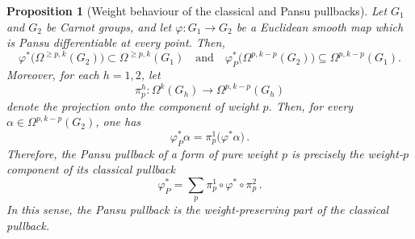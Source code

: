 \documentclass[dvipsnames]{amsart}
\newtheorem{proposition}[theorem]{Proposition}
\theoremstyle{definition}
\theoremstyle{definition}
\numberwithin{equation}{section}
\begin{document}
\begin{proposition}[Weight behaviour of the classical and Pansu pullbacks]
\label{prop:weight-behaviour-pullbacks}
Let \(G_1\) and \(G_2\) be Carnot groups, and let $\varphi:G_1\longrightarrow G_2$
be a Euclidean smooth map which is Pansu differentiable at
every point.
Then,
\begin{equation*}
    \varphi^* \big(\Omega^{\geq p, k}(G_2)\big) \subset \Omega^{\geq p, k} (G_1) \quad \text{and} \quad \varphi_P^*\bigl(\Omega^{p,k-p}(G_2)\bigr)
\subseteq
\Omega^{p,k-p}(G_1).
\end{equation*}
Moreover, for each $h=1,2$, let
\[
\pi_p^h:\Omega^k(G_h)\longrightarrow\Omega^{p,k-p}(G_h)
\]
denote the projection onto the component of weight \(p\). Then, for every
\(\alpha\in\Omega^{p,k-p}(G_2)\), one has $$\varphi_P^*\alpha
=
\pi_p^1\bigl(\varphi^*\alpha\bigr)\,.$$ 
Therefore, the Pansu pullback of a form of pure weight \(p\) is precisely the
weight-\(p\) component of its classical pullback
\[
\varphi_P^*
=
\sum_p\pi_p^1\circ\varphi^*\circ\pi_p^2\,.
\]
In this sense, the Pansu pullback is the weight-preserving part of the
classical pullback.
\end{proposition}
\end{document}
